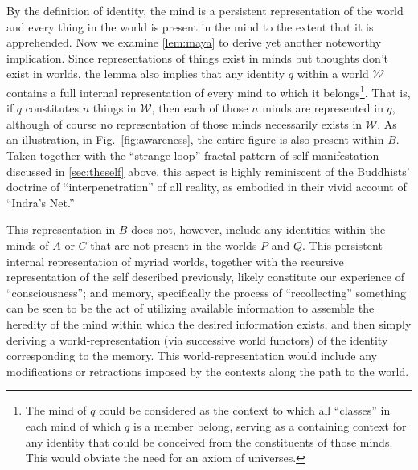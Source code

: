 \documentclass[pra,twocolumn,groupedaddress,10pt]{revtex4}
\theoremstyle{definition}
\begin{document}
By the definition of identity, the mind is a persistent representation of the world and every thing in the world is present in the mind to the extent that it is apprehended. Now we examine \autoref{lem:maya} to derive yet another noteworthy implication. Since representations of things exist in minds but thoughts don't exist in worlds, the lemma also implies that any identity $q$ within a world $\mathcal{W}$ contains a full internal representation of every mind to which it belongs\footnote{The mind of $q$ could be considered as the context to which all ``classes'' in each mind of which $q$ is a member belong, serving as a containing context for any identity that could be conceived from the constituents of those minds. This would obviate the need for an axiom of universes.}. That is, if $q$ constitutes $n$ things in $\mathcal{W}$, then each of those $n$ minds are represented in $q$, although of course no representation of those minds necessarily exists in $\mathcal{W}$. As an illustration, in Fig.~\ref{fig:awareness}, the entire figure is also present within $B$. Taken together with the ``strange loop'' fractal pattern of self manifestation discussed in \autoref{sec:theself} above, this aspect is highly reminiscent of the Buddhists' doctrine of ``interpenetration'' of all reality, as embodied in their vivid account of ``Indra's Net.''\cite{avatamsaka}

This representation in $B$ does not, however, include any identities within the minds of $A$ or $C$ that are not present in the worlds $P$ and $Q$. This persistent internal representation of myriad worlds, together with the recursive representation of the self described previously, likely constitute our experience of ``consciousness''; and memory, specifically the process of ``recollecting'' something can be seen to be the act of utilizing available information to assemble the heredity of the mind within which the desired information exists, and then simply deriving a world-representation (via successive world functors) of the identity corresponding to the memory. This world-representation would include any modifications or retractions imposed by the contexts along the path to the world.
\end{document}
